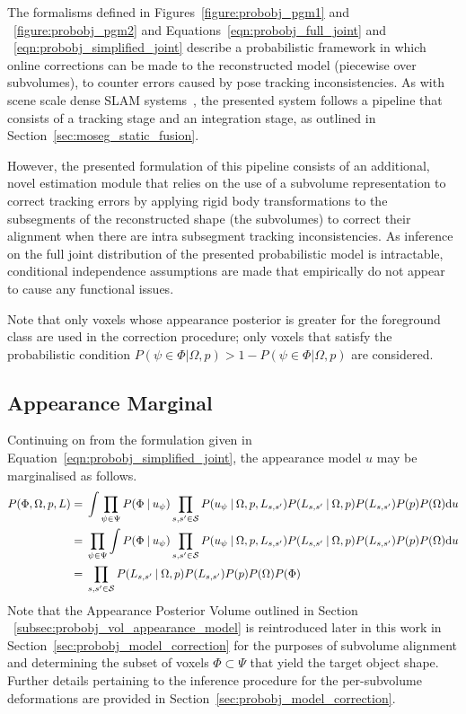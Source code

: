 The formalisms defined in Figures~\ref{figure:probobj_pgm1} and
~\ref{figure:probobj_pgm2} and Equations~\ref{eqn:probobj_full_joint} and
~\ref{eqn:probobj_simplified_joint} describe a probabilistic framework in which
online corrections can be made to the reconstructed model (piecewise over
subvolumes), to counter errors caused by pose tracking inconsistencies. As with
scene scale dense SLAM systems~\cite{Newcombe2011, Prisacariu2014, NieBner2013},
the presented system follows a pipeline that consists of a tracking stage and an
integration stage, as outlined in Section~\ref{sec:moseg_static_fusion}.

However, the presented formulation of this pipeline consists of an
additional, novel estimation module that relies on the use of a subvolume
representation to correct tracking errors by applying rigid body transformations
to the subsegments of the reconstructed shape (the subvolumes) to correct their
alignment when there are intra subsegment tracking inconsistencies. As inference
on the full joint distribution of the presented probabilistic model is intractable, 
conditional independence assumptions are made that empirically do not appear to 
cause any functional issues. 

Note that only voxels whose appearance posterior is greater for the foreground 
class are used in the correction procedure; only voxels that satisfy the probabilistic 
condition \(P(\psi \in \Phi | \Omega, p) > 1 - P(\psi \in \Phi | \Omega, p)\) are 
considered.

\subsection{Appearance Marginal}
Continuing on from the formulation given in Equation~\ref{eqn:probobj_simplified_joint}, 
the appearance model \(u\) may be marginalised as follows.
\begin{align}
  \label{eqn:probobj_appearance_marginal}
  P(\Phi, \Omega, p, L) ={}&
  \int
  \prod_{\psi \in \Psi} P(\Phi \:\vert\: u_{\psi})
  \prod_{s, s' \in \mathcal{S}}P(u_{\psi} \:\vert\: \Omega, p, L_{s, s'})
  P(L_{s, s'} \:\vert\: \Omega, p) P(L_{s, s'})P(p)P(\Omega) {\mathrm d{u}} \\
  ={}& \prod_{\psi \in \Psi} 
  \int P(\Phi \:\vert\: u_{\psi})
  \prod_{s, s' \in \mathcal{S}}P(u_{\psi} \:\vert\: \Omega, p, L_{s, s'})
  P(L_{s, s'} \:\vert\: \Omega, p) P(L_{s, s'})P(p)P(\Omega) {\mathrm d{u}} \\
  ={}& \prod_{s, s' \in \mathcal{S}} P(L_{s, s'} \:\vert\: \Omega, p)
  P(L_{s, s'})P(p)P(\Omega)P(\Phi)
\end{align}
Note that the Appearance Posterior Volume outlined in Section 
~\ref{subsec:probobj_vol_appearance_model} is reintroduced later in this work in
Section~\ref{sec:probobj_model_correction} for the purposes of subvolume alignment 
and determining the subset of voxels \(\Phi \subset \Psi\) that yield the 
target object shape. Further details pertaining to the inference procedure for the 
per-subvolume deformations are provided in Section~\ref{sec:probobj_model_correction}.

